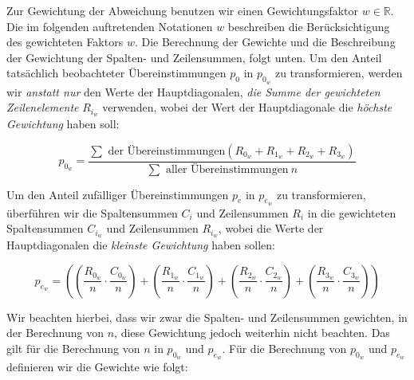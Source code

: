 Zur Gewichtung der Abweichung benutzen wir einen Gewichtungsfaktor $w \in \mathbb{R}$. Die im folgenden auftretenden Notationen $w$ beschreiben die Berücksichtigung des gewichteten Faktors $w$. Die Berechnung der Gewichte und die Beschreibung der Gewichtung der Spalten- und Zeilensummen, folgt unten. Um den Anteil tatsächlich beobachteter Übereinstimmungen $p_0$ in $p_{0_{w}}$ zu transformieren, werden wir \textit{anstatt nur} den Werte der Hauptdiagonalen, \textit{die Summe der gewichteten Zeilenelemente} $R_{i_{w}}$ verwenden, wobei der Wert der Hauptdiagonale die \textit{höchste Gewichtung} haben soll:

\vspace{-1em}
\begin{equation}	
	p_{0_{w}} = \frac{ \sum \text{ der Übereinstimmungen} \left( R_{0_{w}} + R_{1_{w}} + R_{2_{w}}+ R_{3_{w}} \right)}{ \sum \text{ aller Übereinstimmungen} \ n }
\end{equation}
\vspace{-1em}

Um den Anteil zufälliger Übereinstimmungen $p_e$ in $p_{e_{w}}$ zu transformieren, überführen wir die Spaltensummen $C_i$ und Zeilensummen $R_i$ in die gewichteten Spaltensummen $C_{i_{w}}$ und Zeilensummen $R_{i_{w}}$, wobei die Werte der Hauptdiagonalen die \textit{kleinste Gewichtung} haben sollen:

\vspace{-1em}
\begin{equation}	
	p_{e_{w}} = \left(  \left(\frac{  R_{0_{w}}}{ n } \cdot \frac{ C_{0_{w}}}{ n } \right) +   \left(\frac{  R_{1_{w}}}{ n } \cdot \frac{ C_{1_{w}}}{ n } \right) +   \left(\frac{  R_{2_{w}}}{ n } \cdot \frac{ C_{2_{w}}}{ n } \right)  +  \left(\frac{ R_{3_{w}}}{ n } \cdot \frac{ C_{3_{w}}}{ n }\right) \right)
\end{equation}
\vspace{-1em}

Wir beachten hierbei, dass wir zwar die Spalten- und Zeilensummen gewichten, in der Berechnung von $n$, diese Gewichtung jedoch weiterhin nicht beachten. Das gilt für die Berechnung von $n$ in $p_{0_{w}}$ und $p_{e_{w}}$. Für die Berechnung von $p_{0_{w}}$ und $p_{e_{w}}$ definieren wir die Gewichte wie folgt:

